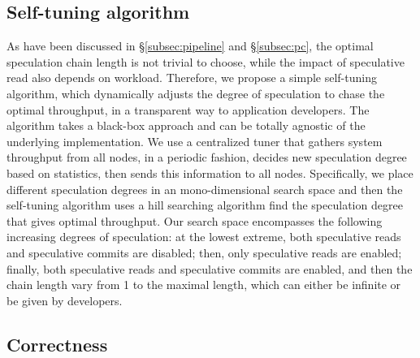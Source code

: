\subsection{Self-tuning algorithm}
As have been discussed in \S \ref{subsec:pipeline} and \S \ref{subsec:pc}, the optimal speculation chain length is not trivial to choose, while the impact of speculative read also depends on workload. Therefore, we propose a simple self-tuning algorithm, which dynamically adjusts the degree of speculation to chase the optimal throughput, in a transparent way to application developers. The algorithm takes a black-box approach and can be totally agnostic of the underlying implementation. We use a centralized tuner that gathers system throughput from all nodes, in a periodic fashion, decides new speculation degree based on statistics, then sends this information to all nodes. Specifically, we place different speculation degrees in an mono-dimensional search space and then the self-tuning algorithm uses a hill searching algorithm \cite{hillclimbing} find the speculation degree that gives optimal throughput. Our search space encompasses the following increasing degrees of speculation: at the lowest extreme, both speculative reads and speculative commits are disabled; then, only speculative reads are enabled; finally, both speculative reads and speculative commits are enabled, and then the chain length vary from 1 to the maximal length, which can either be infinite or be given by developers. 



\iffalse
\subsection{Correctness}
